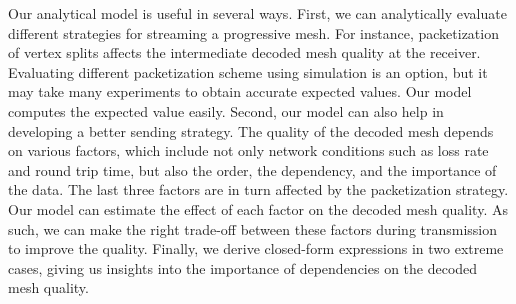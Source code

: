     Our analytical model is useful in several ways.  First,
    we can analytically evaluate different strategies for streaming
    a progressive mesh.  For instance, packetization of vertex
    splits affects the intermediate decoded mesh quality
    at the receiver.  Evaluating different packetization scheme
    using simulation is an option, but
    it may take many experiments to obtain accurate
    expected values.  Our model computes the expected value easily.
    Second, our model can also help in developing a better sending
    strategy.  The quality of the decoded mesh depends on
    various factors, which include not only network conditions such
    as loss rate and round trip time, but also the order, the
    dependency, and the importance of the data.
    The last three factors are in turn affected by the packetization
    strategy.  Our model can estimate the effect of each factor on the
    decoded mesh quality.
    As such, we can make the right trade-off between these factors
    during transmission to improve the quality.
    Finally, we derive closed-form expressions in two extreme cases,
    giving us insights into the importance of dependencies on the
    decoded mesh quality.


